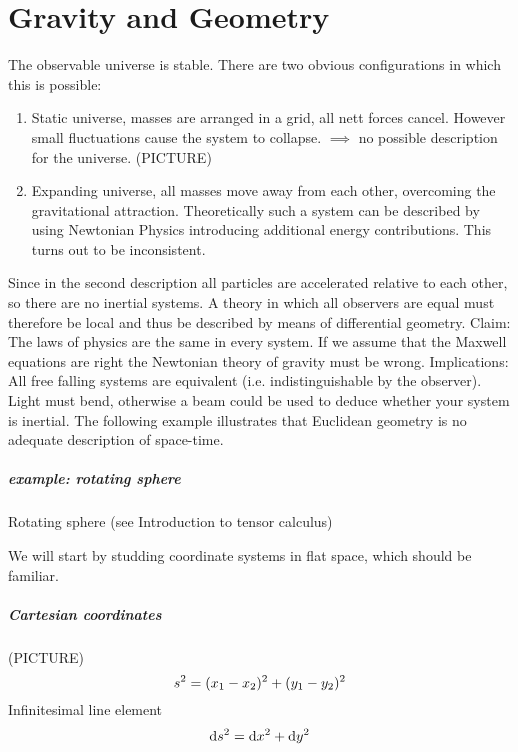\chapter{Gravity and Geometry}
The observable universe is stable. There are two obvious configurations in which this is possible:
\begin{enumerate}
    \item Static universe, masses are arranged in a grid, all nett forces cancel. 
    	  However small fluctuations cause the system to collapse.
    $\implies$ no possible description for the universe. (PICTURE)
    \item Expanding universe, all masses move away from each other, overcoming the gravitational attraction. 
    	  Theoretically such a system can be described by using Newtonian Physics introducing additional energy contributions. 
    	  This turns out to be inconsistent.
\end{enumerate}
Since in the second description all particles are accelerated relative to each other, so there are no inertial systems. 
A theory in which all observers are equal must therefore be local and thus be described by means of differential geometry.
Claim: The laws of physics are the same in every system.
If we assume that the Maxwell equations are right the Newtonian theory of gravity must be wrong.
Implications:
All free falling systems are equivalent (i.e. indistinguishable by the observer). 
Light must bend, otherwise a beam could be used to deduce whether your system is inertial.
The following example illustrates that Euclidean geometry is no adequate description of space-time.
\paragraph{example: rotating sphere}
Rotating sphere (see Introduction to tensor calculus)

We will start by studding coordinate systems in flat space, which should be familiar.
\paragraph{Cartesian coordinates}
(PICTURE)
\begin{equation*}
    s^2=(x_1-x_2)^2+(y_1-y_2)^2\\
\end{equation*}
Infinitesimal line element
\begin{equation}
    \dif s^2=\dif x^2+\dif y^2  \label{eq:cartline}
\end{equation}
